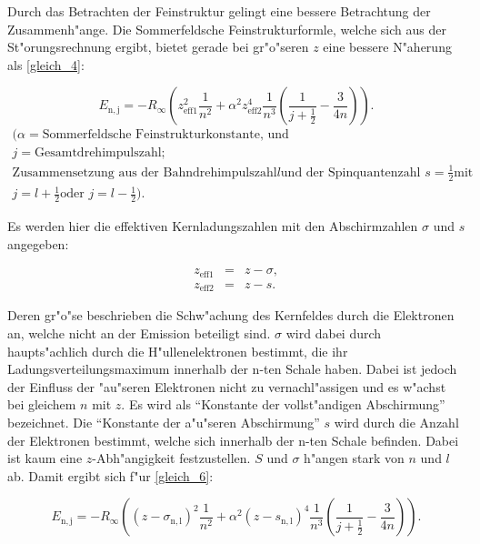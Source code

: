 		Durch das Betrachten der Feinstruktur gelingt eine bessere Betrachtung der Zu\-sam\-men\-h"an\-ge.
		Die Sommerfeldsche Feinstrukturformle, welche sich aus der St"orungsrechnung ergibt, bietet gerade bei gr"o"seren $z$ eine bessere N"aherung als \ref{gleich_4}:

		\begin{equation}
			E_\mathrm{n,j} = -R_\infty \left(z_\mathrm{eff1}^2 \frac{1}{n^2} + \alpha^2 z_\mathrm{eff2}^4 \frac{1}{n^3} \left( \frac{1}{j + \frac{1}{2}} - \frac{3}{4n} \right) \right).\label{gleich_6}
		\end{equation}
		\begin{eqnarray*}
			(\alpha = \text{Sommerfeldsche Feinstrukturkonstante, und } \\
			j = \text{Gesamtdrehimpulszahl;} \\
			\text{Zusammensetzung aus der Bahndrehimpulszahl} l \text{und der Spinquantenzahl } s = \frac{1}{2} \text{mit}\\
			j = l + \frac{1}{2} \text{oder } j = l - \frac{1}{2}).
		\end{eqnarray*}

		Es werden hier die effektiven Kernladungszahlen mit den Abschirmzahlen $\sigma$ und $s$ angegeben:

		\begin{eqnarray*}
			z_\mathrm{eff1} &=& z - \sigma,\\
			z_\mathrm{eff2} &=& z - s.
		\end{eqnarray*}

		Deren gr"o"se beschrieben die Schw"achung des Kernfeldes durch die Elektronen an, welche nicht an der Emission beteiligt sind.
		$\sigma$ wird dabei durch haupts"achlich durch die H"ul\-len\-e\-lek\-tro\-nen bestimmt, die ihr Ladungsverteilungsmaximum innerhalb der n-ten Schale haben.
		Dabei ist jedoch der Einfluss der "au"seren Elektronen nicht zu vernachl"assigen und es w"achst bei gleichem $n$ mit $z$.
		Es wird als "`Konstante der vollst"andigen Abschirmung"' bezeichnet.
		Die "`Konstante der a"u"seren Abschirmung"' $s$ wird durch die Anzahl der Elektronen bestimmt, welche sich innerhalb der n-ten Schale befinden.
		Dabei ist kaum eine $z$-Ab\-h"an\-gig\-keit festzustellen.
		$S$ und $\sigma$ h"angen stark von $n$ und $l$ ab.
		Damit ergibt sich f"ur \ref{gleich_6}:

		\begin{equation}
			E_\mathrm{n,j} = -R_\infty \left( (z - \sigma_\mathrm{n,l})^2 \frac{1}{n^2} + \alpha^2 (z - s_\mathrm{n,l})^4 \frac{1}{n^3} \left( \frac{1}{j + \frac{1}{2}} - \frac{3}{4n} \right) \right). \label{gleich_7}
		\end{equation}

